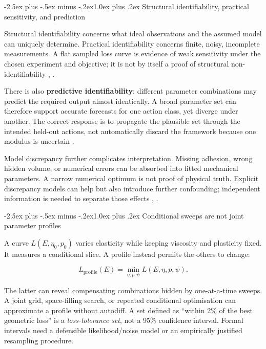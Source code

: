 \documentclass[
  11pt,
]{article}
\makeatletter
\renewcommand\subsection{\needspace{5\baselineskip}\@startsection{subsection}{2}{\z@}%
  {-2.5ex plus -.5ex minus -.2ex}{1.0ex plus .2ex}%
  {\normalfont\sffamily\large\bfseries\color{accent}}}
\makeatother
\begin{document}
\subsection{Structural identifiability, practical sensitivity, and
prediction}\label{structural-identifiability-practical-sensitivity-and-prediction}

Structural identifiability concerns what ideal observations and the
assumed model can uniquely determine. Practical identifiability concerns
finite, noisy, incomplete measurements. A flat sampled loss curve is
evidence of weak sensitivity under the chosen experiment and objective;
it is not by itself a proof of structural non-identifiability
, .

There is also \textbf{predictive identifiability}: different parameter
combinations may predict the required output almost identically. A broad
parameter set can therefore support accurate forecasts for one action
class, yet diverge under another. The correct response is to propagate
the plausible set through the intended held-out actions, not
automatically discard the framework because one modulus is uncertain
.

Model discrepancy further complicates interpretation. Missing adhesion,
wrong hidden volume, or numerical errors can be absorbed into fitted
mechanical parameters. A narrow numerical optimum is not proof of
physical truth. Explicit discrepancy models can help but also introduce
further confounding; independent information is needed to separate those
effects ,
.

\subsection{Conditional sweeps are not joint parameter
profiles}\label{conditional-sweeps-are-not-joint-parameter-profiles}

A curve \(L(E,\eta_0,p_0)\) varies elasticity while keeping viscosity
and plasticity fixed. It measures a conditional slice. A profile instead
permits the others to change:

\[
L_{\mathrm{profile}}(E)=\min_{\eta,p,\psi}L(E,\eta,p,\psi).
\]

The latter can reveal compensating combinations hidden by one-at-a-time
sweeps. A joint grid, space-filling search, or repeated conditional
optimisation can approximate a profile without autodiff. A set defined
as ``within 2\% of the best geometric loss'' is a \emph{loss-tolerance
set}, not a 95\% confidence interval. Formal intervals need a defensible
likelihood/noise model or an empirically justified resampling procedure.
\end{document}
